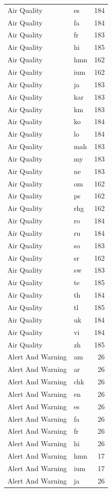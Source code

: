 \begin{longtable}{p{3cm} p{3cm} r}
Air Quality & es & 184 \\
Air Quality & fa & 184 \\
Air Quality & fr & 183 \\
Air Quality & hi & 185 \\
Air Quality & hmn & 162 \\
Air Quality & ium & 162 \\
Air Quality & ja & 183 \\
Air Quality & kar & 183 \\
Air Quality & km & 183 \\
Air Quality & ko & 184 \\
Air Quality & lo & 184 \\
Air Quality & mah & 183 \\
Air Quality & my & 183 \\
Air Quality & ne & 183 \\
Air Quality & om & 162 \\
Air Quality & ps & 162 \\
Air Quality & rhg & 162 \\
Air Quality & ro & 184 \\
Air Quality & ru & 184 \\
Air Quality & so & 183 \\
Air Quality & sr & 162 \\
Air Quality & sw & 183 \\
Air Quality & te & 185 \\
Air Quality & th & 184 \\
Air Quality & tl & 185 \\
Air Quality & uk & 184 \\
Air Quality & vi & 184 \\
Air Quality & zh & 185 \\
Alert And Warning & am & 26 \\
Alert And Warning & ar & 26 \\
Alert And Warning & chk & 26 \\
Alert And Warning & en & 26 \\
Alert And Warning & es & 26 \\
Alert And Warning & fa & 26 \\
Alert And Warning & fr & 26 \\
Alert And Warning & hi & 26 \\
Alert And Warning & hmn & 17 \\
Alert And Warning & ium & 17 \\
Alert And Warning & ja & 26 \\

\end{longtable}
